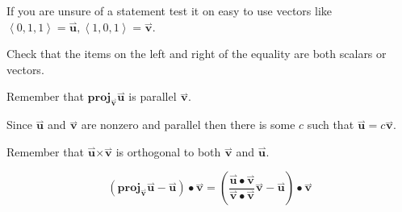\documentclass{ximera}
\begin{document}
\begin{exercise}
\begin{hint}
If you are unsure of a statement test it on easy to use vectors like $\left< 0,1,1 \right> =\overset{\boldsymbol{\rightharpoonup}}{\mathbf{u}} , \left< 1,0,1 \right> = \overset{\boldsymbol{\rightharpoonup}}{\mathbf{v}}$.
\end{hint}

\begin{hint}
Check that the items on the left and right of the equality are both
scalars or vectors.
\end{hint}

\begin{hint}
Remember that $\mathbf{proj}_{\overset{\boldsymbol{\rightharpoonup}}{\mathbf{v}}} \overset{\boldsymbol{\rightharpoonup}}{\mathbf{u}}$ is parallel $\overset{\boldsymbol{\rightharpoonup}}{\mathbf{v}}$.
\end{hint}

\begin{hint}
Since $\overset{\boldsymbol{\rightharpoonup}}{\mathbf{u}}$ and $\overset{\boldsymbol{\rightharpoonup}}{\mathbf{v}}$ are nonzero and parallel then there is some $c$ such that $\overset{\boldsymbol{\rightharpoonup}}{\mathbf{u}} = c \overset{\boldsymbol{\rightharpoonup}}{\mathbf{v}}$.
\end{hint}

\begin{hint}
Remember that $\overset{\boldsymbol{\rightharpoonup}}{\mathbf{u}} \boldsymbol\times \overset{\boldsymbol{\rightharpoonup}}{\mathbf{v}}$ is orthogonal to both $\overset{\boldsymbol{\rightharpoonup}}{\mathbf{v}}$ and $\overset{\boldsymbol{\rightharpoonup}}{\mathbf{u}}$.
\end{hint}

\begin{hint}
\[
(\mathbf{proj}_{\overset{\boldsymbol{\rightharpoonup}}{\mathbf{v}}} \overset{\boldsymbol{\rightharpoonup}}{\mathbf{u}} -\overset{\boldsymbol{\rightharpoonup}}{\mathbf{u}}) \bullet \overset{\boldsymbol{\rightharpoonup}}{\mathbf{v}} = \left(\frac {\overset{\boldsymbol{\rightharpoonup}}{\mathbf{u}} \bullet \overset{\boldsymbol{\rightharpoonup}}{\mathbf{v}}} {\overset{\boldsymbol{\rightharpoonup}}{\mathbf{v}}\bullet \overset{\boldsymbol{\rightharpoonup}}{\mathbf{v}}} \overset{\boldsymbol{\rightharpoonup}}{\mathbf{v}} -\overset{\boldsymbol{\rightharpoonup}}{\mathbf{u}}\right)\bullet \overset{\boldsymbol{\rightharpoonup}}{\mathbf{v}}
\]
\end{hint}
\end{exercise}
\end{document}
